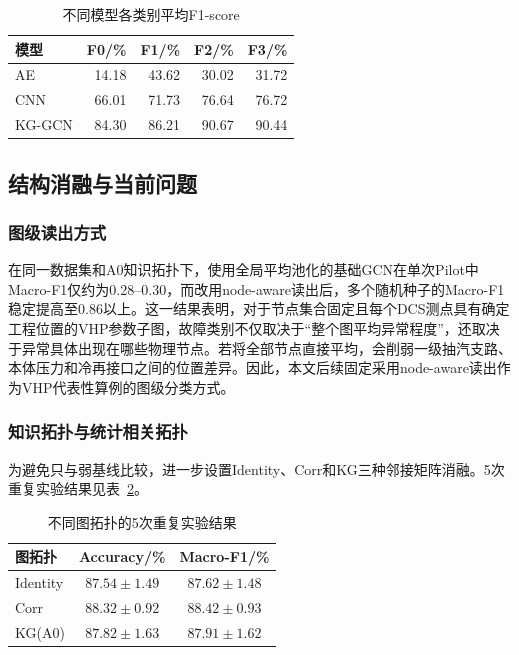 \begin{table}[htbp]
    \centering
    \caption{不同模型各类别平均F1-score}
    \label{tab:per_class_f1_v2}
    \begin{tabular}{lrrrr}
        \toprule
        模型 & F0/\% & F1/\% & F2/\% & F3/\% \\
        \midrule
        AE & 14.18 & 43.62 & 30.02 & 31.72 \\
        CNN & 66.01 & 71.73 & 76.64 & 76.72 \\
        KG-GCN & 84.30 & 86.21 & 90.67 & 90.44 \\
        \bottomrule
    \end{tabular}
\end{table}

\subsection{结构消融与当前问题}
\label{subsec:ablation_v2}

\subsubsection{图级读出方式}

在同一数据集和A0知识拓扑下，使用全局平均池化的基础GCN在单次Pilot中Macro-F1仅约为0.28--0.30，而改用node-aware读出后，多个随机种子的Macro-F1稳定提高至0.86以上。这一结果表明，对于节点集合固定且每个DCS测点具有确定工程位置的VHP参数子图，故障类别不仅取决于“整个图平均异常程度”，还取决于异常具体出现在哪些物理节点。若将全部节点直接平均，会削弱一级抽汽支路、本体压力和冷再接口之间的位置差异。因此，本文后续固定采用node-aware读出作为VHP代表性算例的图级分类方式。

\subsubsection{知识拓扑与统计相关拓扑}

为避免只与弱基线比较，进一步设置Identity、Corr和KG三种邻接矩阵消融。5次重复实验结果见表~\ref{tab:topology_ablation_v2}。

\begin{table}[htbp]
    \centering
    \caption{不同图拓扑的5次重复实验结果}
    \label{tab:topology_ablation_v2}
    \begin{tabular}{lcc}
        \toprule
        图拓扑 & Accuracy/\% & Macro-F1/\% \\
        \midrule
        Identity & $87.54\pm1.49$ & $87.62\pm1.48$ \\
        Corr & $88.32\pm0.92$ & $88.42\pm0.93$ \\
        KG(A0) & $87.82\pm1.63$ & $87.91\pm1.62$ \\
        \bottomrule
    \end{tabular}
\end{table}

